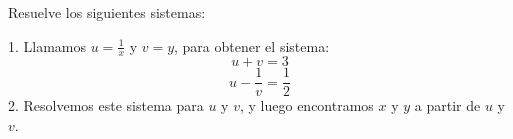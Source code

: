 \documentclass[addpoints,spanish, 12pt,a4paper]{exam}
\renewcommand*\half{.5}
\begin{document}
\begin{questions}
\question Resuelve los siguientes sistemas:





\begin{solution}
1. Llamamos \(u = \frac{1}{x}\) y \(v = y\), para obtener el sistema:
   \[
   u + v = 3
   \]
   \[
   u - \frac{1}{v} = \frac{1}{2}
   \]
2. Resolvemos este sistema para \(u\) y \(v\), y luego encontramos \(x\) y \(y\) a partir de \(u\) y \(v\).
\end{solution}


\end{questions}
\end{document}
